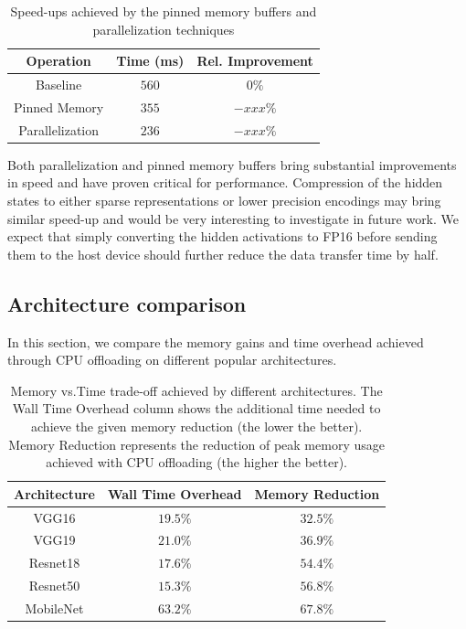 \documentclass[11pt,onecolumn]{article}
\begin{document}
\begin{table}[h]
\begin{center}
\begin{tabular}{ c c c}	
\hline
Operation                   & Time (ms)  & Rel. Improvement\\
\hline
Baseline                    &  $560$    & $0\%$      \\
Pinned Memory               &  $355$    & $-xxx\%$ \\
Parallelization             &  $236$    & $-xxx\%$ \\
\hline
\end{tabular}
\caption{Speed-ups achieved by the pinned memory buffers and parallelization techniques}
\end{center}
\end{table}

Both parallelization and pinned memory buffers bring substantial improvements 
in speed and have proven critical for performance.
Compression of the hidden states to either sparse representations or lower precision
encodings may bring similar speed-up and would be very interesting to investigate in future work. 	
We expect that simply converting the hidden activations to FP16 before sending them
to the host device should further reduce the data transfer time by half.

\subsection{Architecture comparison}

In this section, we compare the memory gains and time overhead 
achieved through CPU offloading on different popular architectures.

\begin{table}[h]
\begin{center}
\begin{tabular}{ c c c}	
\hline
Architecture            & Wall Time Overhead & Memory Reduction    \\
\hline
VGG16                   &  $19.5\%$            & $32.5\%$          \\
VGG19                   &  $21.0\%$            & $36.9\%$          \\
Resnet18       	        &  $17.6\%$            & $54.4\%$          \\
Resnet50                &  $15.3\%$            & $56.8\%$          \\
MobileNet               &  $63.2\%$            & $67.8\%$          \\
\hline
\end{tabular}
\caption{Memory vs.Time trade-off achieved by different architectures.
The Wall Time Overhead column shows the additional time needed to achieve the given memory reduction (the lower the better).
Memory Reduction represents the reduction of peak memory usage achieved with CPU offloading (the higher the better).}
\end{center}
\end{table}
\end{document}
